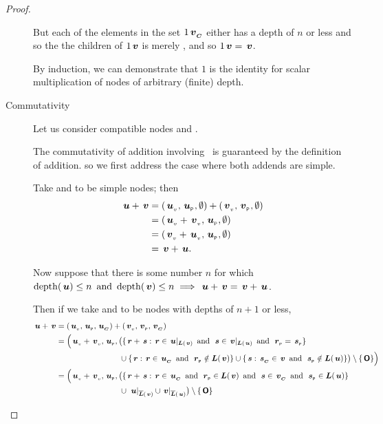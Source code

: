 \begin{proposition}
\begin{proof}
\begin{description}
      But each of the elements in the set \(1\child{v}\) either has a
      depth of \(n\) or less and so the the children of \(1 \node{v}\)
      is merely , and so \(1 \node{v} = \node{v}\).

      By induction, we can demonstrate that \(1\) is the 
      identity for scalar multiplication of nodes of arbitrary (finite) depth.


    \item[Commutativity]\label{additivecommutativity}

      Let us consider compatible nodes  and .

      The commutativity of addition involving \tzerotree\ is
      guaranteed by the definition of addition. so we first address
      the case where both addends are simple.

      Take  and  to be simple nodes; then
      \begin{align*}
          \node{u} + \node{v} &= (\nv{u}, \nlabel{u}, \emptyset) + (\nv{v}, \nlabel{v}, \emptyset) \notag\\
          &= (\nv{u} + \nv{v}, \nlabel{u}, \emptyset) \notag\\
          &= (\nv{v} + \nv{u}, \nlabel{u}, \emptyset) \notag\\
          &= \node{v} + \node{u}.
      \end{align*}

      Now suppose that there is some number \(n\) for which
      \(\depth(\node{u}) \leq n \mand \depth(\node{v}) \leq n
      \implies \node{u} + \node{v} = \node{v} + \node{u}\).

      Then if we take  and  to be nodes with depths
      of \(n+1\) or less,
      \begin{align*}
          \node{u} + \node{v} &= (\nv{u}, \nlabel{u}, \child{u}) + (\nv{v}, \nlabel{v}, \child{v}) \notag\\
          &= \Bigl(\nv{u} + \nv{v}, \nlabel{u}, \bigl(\{\node{r}+\node{s} : \node{r} \in \restrictedto{u}{v} \mand \node{s} \in \restrictedto{v}{u}\mand\nlabel{r} = \nlabel{s}\} \notag\\
          & \qquad \qquad \qquad \qquad \cup \{\node{r} : \node{r} \in \child{u}\mand\nlabel{r} \notin \nlabels{v}\} \cup \{\node{s} : \child{s} \in \node{v}\mand\nlabel{s} \notin \nlabels{u}\}\bigr) \setminus \{\zerotree\}\Bigr) \notag\\
          &= \Bigl(\nv{u} + \nv{v}, \nlabel{u}, \bigl(\{\node{r}+\node{s} : \node{r} \in \child{u} \mand \nlabel{r} \in \nlabels{v} \mand \node{s} \in \child{v}\mand\nlabel{s} \in \nlabels{u}\} \notag\\
          & \qquad \qquad \qquad \qquad         \cup \nrestrictedto{\node{u}}{v} \cup \nrestrictedto{v}{u}\bigr) \setminus \{\zerotree\}
      \end{align*}
          

\end{description}
\end{proof}
\end{proposition}
